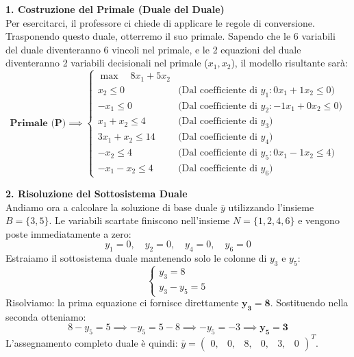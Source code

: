 \documentclass[12pt, a4paper]{article}
\begin{document}
	\vspace{0.3cm}
	\textbf{1. Costruzione del Primale (Duale del Duale)}\\
	Per esercitarci, il professore ci chiede di applicare le regole di conversione. Trasponendo questo duale, otterremo il suo primale.
	Sapendo che le 6 variabili del duale diventeranno 6 vincoli nel primale, e le 2 equazioni del duale diventeranno 2 variabili decisionali nel primale ($x_1, x_2$), il modello risultante sarà:
	\[
	\textbf{Primale (P)} \implies
	\begin{cases}
		\max \quad 8x_1 + 5x_2 \\[6pt]
		x_2 \leq 0 \quad &\text{(Dal coefficiente di } y_1: 0x_1 + 1x_2 \leq 0) \\
		-x_1 \leq 0 \quad &\text{(Dal coefficiente di } y_2: -1x_1 + 0x_2 \leq 0) \\
		x_1 + x_2 \leq 4 \quad &\text{(Dal coefficiente di } y_3) \\
		3x_1 + x_2 \leq 14 \quad &\text{(Dal coefficiente di } y_4) \\
		-x_2 \leq 4 \quad &\text{(Dal coefficiente di } y_5: 0x_1 - 1x_2 \leq 4) \\
		-x_1 - x_2 \leq 4 \quad &\text{(Dal coefficiente di } y_6)
	\end{cases}
	\]
	
	\vspace{0.3cm}
	\textbf{2. Risoluzione del Sottosistema Duale}\\
	Andiamo ora a calcolare la soluzione di base duale $\bar{y}$ utilizzando l'insieme $B = \{3, 5\}$. Le variabili scartate finiscono nell'insieme $N = \{1, 2, 4, 6\}$ e vengono poste immediatamente a zero:
	\[
	y_1 = 0, \quad y_2 = 0, \quad y_4 = 0, \quad y_6 = 0
	\]
	Estraiamo il sottosistema duale mantenendo solo le colonne di $y_3$ e $y_5$:
	\[
	\begin{cases}
		y_3 = 8 \\
		y_3 - y_5 = 5
	\end{cases}
	\]
	Risolviamo: la prima equazione ci fornisce direttamente $\mathbf{y_3 = 8}$. 
	Sostituendo nella seconda otteniamo:
	\[
	8 - y_5 = 5 \implies -y_5 = 5 - 8 \implies -y_5 = -3 \implies \mathbf{y_5 = 3}
	\]
	L'assegnamento completo duale è quindi: $\bar{y} = \begin{pmatrix} 0, & 0, & 8, & 0, & 3, & 0 \end{pmatrix}^T$. 
	
\end{document}
